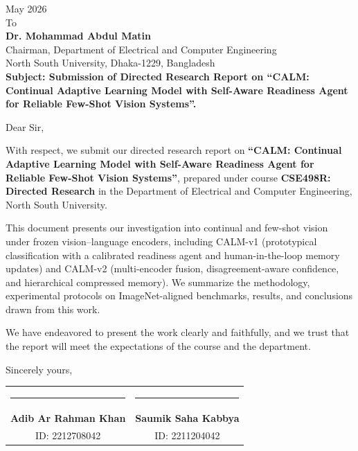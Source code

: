 \documentclass[12pt,a4paper]{report}
\begin{document}
\begin{flushleft}
May 2026 \\
\vspace{0.5cm}
To \\
\textbf{Dr. Mohammad Abdul Matin} \\
Chairman, Department of Electrical and Computer Engineering \\
North South University, Dhaka-1229, Bangladesh \\

\vspace{0.5cm}
\textbf{Subject: Submission of Directed Research Report on ``CALM: Continual Adaptive Learning Model with Self-Aware Readiness Agent for Reliable Few-Shot Vision Systems''.}

\vspace{0.5cm}
Dear Sir,

With respect, we submit our directed research report on \textbf{``CALM: Continual Adaptive Learning Model with Self-Aware Readiness Agent for Reliable Few-Shot Vision Systems''}, prepared under course \textbf{CSE498R: Directed Research} in the Department of Electrical and Computer Engineering, North South University.

This document presents our investigation into continual and few-shot vision under frozen vision--language encoders, including CALM-v1 (prototypical classification with a calibrated readiness agent and human-in-the-loop memory updates) and CALM-v2 (multi-encoder fusion, disagreement-aware confidence, and hierarchical compressed memory). We summarize the methodology, experimental protocols on ImageNet-aligned benchmarks, results, and conclusions drawn from this work.

We have endeavored to present the work clearly and faithfully, and we trust that the report will meet the expectations of the course and the department.

\vspace{1cm}
Sincerely yours,

\vspace{1.5cm}
\begin{tabular}{cc}
\rule{6cm}{0.4pt} & \rule{6cm}{0.4pt} \\
\textbf{Adib Ar Rahman Khan} & \textbf{Saumik Saha Kabbya} \\
ID: 2212708042 & ID: 2211204042
\end{tabular}
\end{flushleft}

\clearpage
\end{document}
